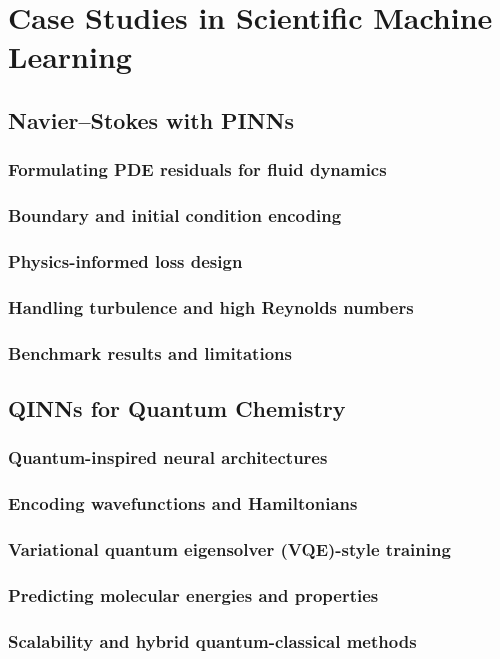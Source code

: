 ﻿\chapter{Case Studies in Scientific Machine Learning}
\section{Navier--Stokes with PINNs}
\subsection{Formulating PDE residuals for fluid dynamics}
\subsection{Boundary and initial condition encoding}
\subsection{Physics-informed loss design}
\subsection{Handling turbulence and high Reynolds numbers}
\subsection{Benchmark results and limitations}

\section{QINNs for Quantum Chemistry}
\subsection{Quantum-inspired neural architectures}
\subsection{Encoding wavefunctions and Hamiltonians}
\subsection{Variational quantum eigensolver (VQE)-style training}
\subsection{Predicting molecular energies and properties}
\subsection{Scalability and hybrid quantum-classical methods}


